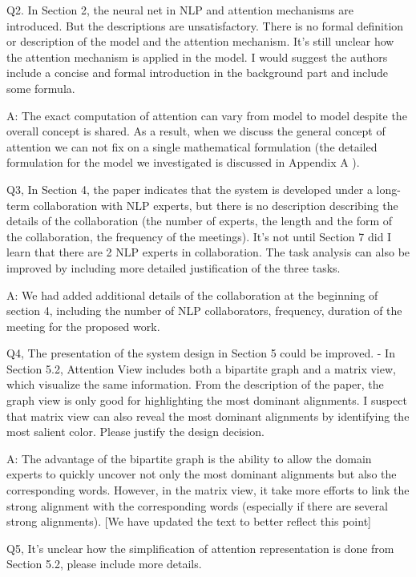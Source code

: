 Q2. In Section 2, the neural net in NLP and attention mechanisms are introduced. But the descriptions are unsatisfactory. There is no formal definition or description of the model and the attention mechanism. It's still unclear how the attention mechanism is applied in the model. I would suggest the authors include a concise and formal introduction in the background part and include some formula.

A: The exact computation of attention can vary from model to model despite the overall concept is shared. As a result, when we discuss the general concept of attention we can not fix on a single mathematical formulation (the detailed formulation for the model we investigated is discussed in Appendix A ). 

Q3, In Section 4, the paper indicates that the system is developed under a long-term collaboration with NLP experts, but there is no description describing the details of the collaboration (the number of experts, the length and the form of the collaboration, the frequency of the meetings). It's not until Section 7 did I learn that there are 2 NLP experts in collaboration. The task analysis can also be improved by including more detailed justification of the three tasks.

A: We had added additional details of the collaboration at the beginning of section 4, including the number of NLP collaborators, frequency, duration of the meeting for the proposed work.

Q4, The presentation of the system design in Section 5 could be improved.
- In Section 5.2, Attention View includes both a bipartite graph and a matrix view, which visualize the same information. From the description of the paper, the graph view is only good for highlighting the most dominant alignments. I suspect that matrix view can also reveal the most dominant alignments by identifying the most salient color. Please justify the design decision.

A: The advantage of the bipartite graph is the ability to allow the domain experts to quickly uncover not only the most dominant alignments but also the corresponding words. However, in the matrix view, it take more efforts to link the strong alignment with the corresponding words (especially if there are several strong alignments). [We have updated the text to better reflect this point]

Q5, It's unclear how the simplification of attention representation is done from Section 5.2, please include more details.

